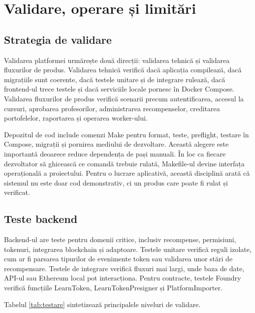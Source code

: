 \chapter{Validare, operare și limitări}

\section{Strategia de validare}
Validarea platformei urmărește două direcții: validarea tehnică și validarea fluxurilor de produs. Validarea tehnică verifică dacă aplicația compilează, dacă migrațiile sunt coerente, dacă testele unitare și de integrare rulează, dacă frontend-ul trece testele și dacă serviciile locale pornesc în Docker Compose. Validarea fluxurilor de produs verifică scenarii precum autentificarea, accesul la cursuri, aprobarea profesorilor, administrarea recompenselor, creditarea portofelelor, raportarea și operarea worker-ului.

Depozitul de cod include comenzi Make pentru format, teste, preflight, testare în Compose, migrații și pornirea mediului de dezvoltare. Această alegere este importantă deoarece reduce dependența de pași manuali. În loc ca fiecare dezvoltator să ghicească ce comandă trebuie rulată, Makefile-ul devine interfața operațională a proiectului. Pentru o lucrare aplicativă, această disciplină arată că sistemul nu este doar cod demonstrativ, ci un produs care poate fi rulat și verificat.

\section{Teste backend}
Backend-ul are teste pentru domenii critice, inclusiv recompense, permisiuni, tokenuri, integrarea blockchain și adaptoare. Testele unitare verifică reguli izolate, cum ar fi parsarea tipurilor de evenimente token sau validarea unor stări de recompensare. Testele de integrare verifică fluxuri mai largi, unde baza de date, API-ul sau Ethereum local pot interacționa. Pentru contracte, testele Foundry verifică funcțiile LearnToken, LearnTokenPresigner și PlatformImporter.

Tabelul \ref{tab:testare} sintetizează principalele niveluri de validare.

